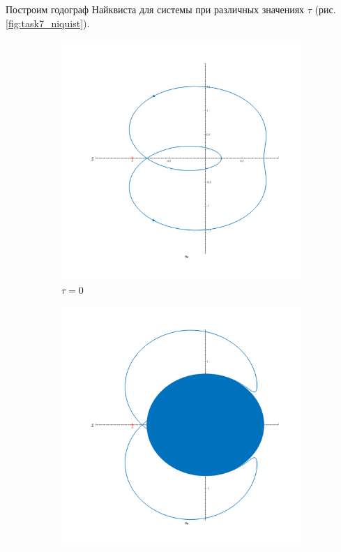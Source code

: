 Построим годограф Найквиста для системы при различных значениях $\tau$ (рис. \ref{fig:task7_niquist}).
\begin{figure}[ht!]
    \begin{subfigure}[b]{0.5\textwidth}
        \centering
        \includegraphics[width=\textwidth]{media/plots/task7_nyquist_open_1.png}
        \caption{$\tau = 0$}
    \end{subfigure}
    \begin{subfigure}[b]{0.5\textwidth}
        \centering
        \includegraphics[width=\textwidth]{media/plots/task7_nyquist_open_2.png}

\end{subfigure}
\end{figure}
